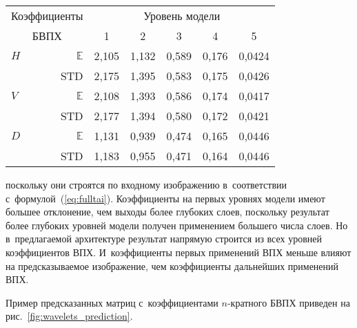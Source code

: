 \begin{multicols}{2}
\begin{center}
{\small \tabcolsep=4pt
\begin{tabular}{ |l r|c|c|c|c|c| }
\hline
 \multicolumn{2}{|c|}{Коэффициенты} & 
\multicolumn{5}{c|}{Уровень модели} \\ 
\cline{3-7}
 \multicolumn{2}{|c|}{БВПХ}  & 1 & 2 & 3 & 4 & 5 \\ 
 \hline
$H$ & $\mathbb{E}$ & 2,105 & 1,132 & 0,589 & 0,176 & 0,0424 \\
 & STD & 2,175 & 1,395 & 0,583 & 0,175 & 0,0426 \\ 
 \hline
 $V$ & $\mathbb{E}$ & 2,108 & 1,393 & 0,586 & 0,174 & 0,0417 \\
 & STD & 2,177 & 1,394 & 0,580 & 0,172 & 0,0421 \\ 
 \hline
$D$ & $\mathbb{E}$ & 1,131 & 0,939 & 0,474 & 0,165 & 0,0446 \\
 & STD & 1,183 & 0,955 & 0,471 & 0,164 & 0,0446 \\ 
 \hline
\end{tabular}
}
\end{center}

\noindent
 поскольку они строятся по входному изображению 
в~соответствии с~формулой~(\ref{eq:fulltai}). Коэффициенты на первых уровнях 
модели имеют большее отклонение, чем выходы более глубоких слоев, поскольку 
результат более глубоких уровней модели получен применением большего числа 
слоев. Но в~предлагаемой архитектуре результат напрямую строится из всех уровней 
коэффициентов ВПХ. И~коэффициенты первых применений ВПХ меньше влияют на 
предсказываемое изображение, чем коэффициенты дальнейших применений ВПХ.



Пример предсказанных матриц с~коэффициентами $n$-крат\-но\-го БВПХ приведен на 
рис.~\ref{fig:wavelets_prediction}.

\pagebreak

\end{multicols}


